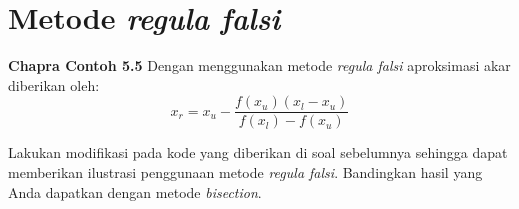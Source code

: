 \section{Metode \textit{regula falsi}}

\textbf{Chapra Contoh 5.5}
Dengan menggunakan metode \textit{regula falsi} aproksimasi akar diberikan oleh:
\begin{equation}
x_{r} = x_{u} - \frac{f(x_u)(x_{l} - x_{u})}{f(x_l) - f(x_u)}
\end{equation}

\begin{soal}
Lakukan modifikasi pada kode yang diberikan di soal sebelumnya sehingga dapat
memberikan ilustrasi penggunaan metode \textit{regula falsi}. Bandingkan hasil yang
Anda dapatkan dengan metode \textit{bisection}.
\end{soal}